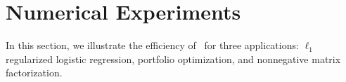 \section{Numerical Experiments}
In this section, we illustrate the efficiency of \pkg~for three applications: $\ell_1$ regularized logistic regression, portfolio optimization,  and nonnegative matrix factorization.




